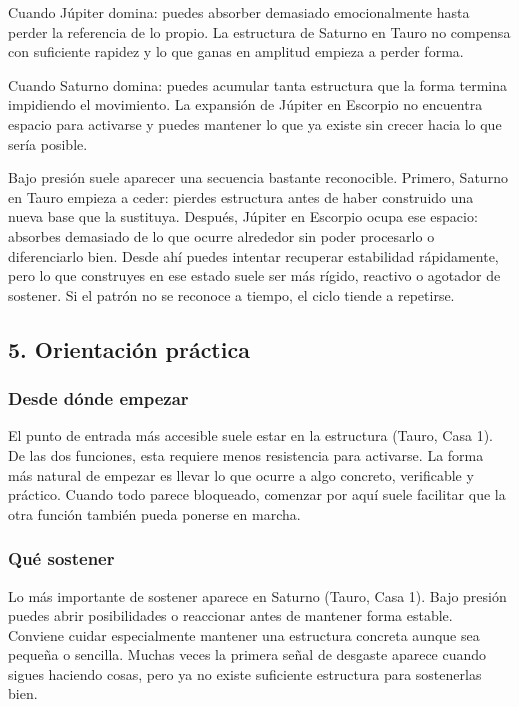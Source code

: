 \documentclass[11pt,a4paper]{article}
\begin{document}
Cuando Júpiter domina: puedes absorber demasiado emocionalmente hasta perder la referencia de lo propio. La estructura de Saturno en Tauro no compensa con suficiente rapidez y lo que ganas en amplitud empieza a perder forma.

Cuando Saturno domina: puedes acumular tanta estructura que la forma termina impidiendo el movimiento. La expansión de Júpiter en Escorpio no encuentra espacio para activarse y puedes mantener lo que ya existe sin crecer hacia lo que sería posible.

Bajo presión suele aparecer una secuencia bastante reconocible. Primero, Saturno en Tauro empieza a ceder: pierdes estructura antes de haber construido una nueva base que la sustituya. Después, Júpiter en Escorpio ocupa ese espacio: absorbes demasiado de lo que ocurre alrededor sin poder procesarlo o diferenciarlo bien. Desde ahí puedes intentar recuperar estabilidad rápidamente, pero lo que construyes en ese estado suele ser más rígido, reactivo o agotador de sostener. Si el patrón no se reconoce a tiempo, el ciclo tiende a repetirse.

\vspace{0.8cm}


\subsection{5. Orientación práctica}

\subsubsection*{Desde dónde empezar}

El punto de entrada más accesible suele estar en la estructura (Tauro, Casa 1). De las dos funciones, esta requiere menos resistencia para activarse. La forma más natural de empezar es llevar lo que ocurre a algo concreto, verificable y práctico. Cuando todo parece bloqueado, comenzar por aquí suele facilitar que la otra función también pueda ponerse en marcha.

\subsubsection*{Qué sostener}

Lo más importante de sostener aparece en Saturno (Tauro, Casa 1). Bajo presión puedes abrir posibilidades o reaccionar antes de mantener forma estable. Conviene cuidar especialmente mantener una estructura concreta aunque sea pequeña o sencilla. Muchas veces la primera señal de desgaste aparece cuando sigues haciendo cosas, pero ya no existe suficiente estructura para sostenerlas bien.
\end{document}
